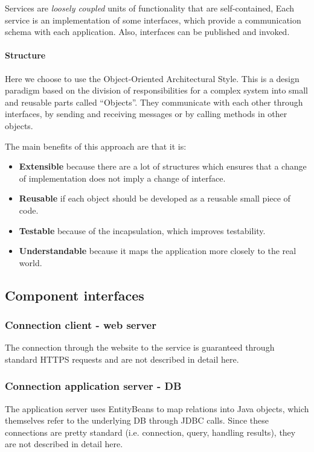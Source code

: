 Services are \textit{loosely coupled} units of functionality that are self-contained, 
Each service is an implementation of some interfaces, which provide a communication schema with
each application. Also, interfaces can be published and invoked.

\paragraph{Structure} Here we choose to use the Object-Oriented Architectural Style.
This is a design paradigm based on the division of responsibilities for a complex system
into small and reusable parts called ``Objects''.
They communicate with each other through interfaces, by sending and receiving messages
or by calling methods in other objects.

The main benefits of this approach are that it is:

\begin{itemize}
    \item{\textbf{Extensible} because there are a lot of structures which ensures that a change of implementation does not imply a change of interface.}
    \item{\textbf{Reusable} if each object should be developed as a reusable small piece of code.}
    \item{\textbf{Testable} because of the incapsulation, which improves testability.}
    \item{\textbf{Understandable} because it maps the application more closely to the real world.}
\end{itemize}

\newpage
\subsection{Component interfaces}
\label{sub:component_interfaces}

\subsubsection{Connection client - web server} %
\label{ssub:https}
The connection through the website to the service is guaranteed through standard HTTPS requests and are not described in detail here.

\subsubsection{Connection application server - DB} %
\label{ssub:connection_application_server_db}
The application server uses EntityBeans to map relations into Java objects, which themselves refer to the underlying DB through JDBC calls. Since these connections are pretty standard (i.e. connection, query, handling results), they are not described in detail here.


